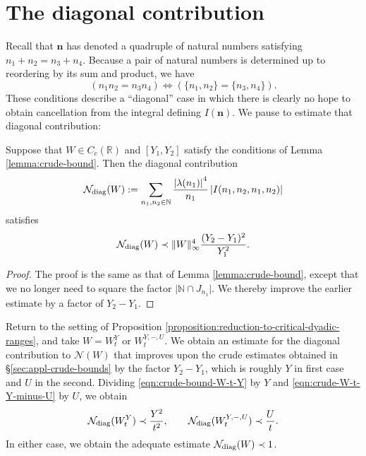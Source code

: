 \documentclass[reqno]{amsart} 
\begin{document}
\section{The diagonal contribution}\label{sec:cqx50az6mj}
Recall that $\mathbf{n}$ has denoted a quadruple of natural numbers satisfying $n _1 + n _2 = n _3 + n _4$.  Because a pair of natural numbers is determined up to reordering by its sum and product, we have
\begin{equation*}
  (n_1 n_2 = n_3 n_4) \iff ( \{n_1, n_2\} = \{n_3, n_4\}).
\end{equation*}
These conditions describe a ``diagonal'' case in which there is clearly no hope to obtain cancellation from the integral defining $I(\mathbf{n})$.  We pause to estimate that diagonal contribution:
\begin{lemma}
  Suppose that $W \in C_c(\mathbb{R})$ and $[Y_1,Y_2]$ satisfy the conditions of Lemma \ref{lemma:crude-bound}.  Then the diagonal contribution
  \begin{equation*}
    \mathcal{N}_{\operatorname{diag}}(W) := \sum _{n_1, n_2 \in \mathbb{N}}
    \frac{\left\lvert \lambda (n _1 ) \right\rvert ^4 }{ n _1 } \left\lvert I (n _1, n _2, n _1, n _2 ) \right\rvert
  \end{equation*}
  satisfies
  \begin{equation*}
    \mathcal{N}_{\operatorname{diag}}(W)
    \prec \lVert W \rVert_{\infty}^4 \frac{(Y _2 - Y _1 ) ^2 }{Y_1 ^2}.
  \end{equation*}
\end{lemma}
\begin{proof}
  The proof is the same as that of Lemma \ref{lemma:crude-bound}, except that we no longer need to square the factor $\lvert \mathbb{N} \cap J _{n_1} \rvert$.  We thereby improve the earlier estimate by a factor of $Y_2 - Y_1$.
\end{proof}
Return to the setting of Proposition \ref{proposition:reduction-to-critical-dyadic-ranges}, and take $W = W_t^Y$ or $W_t^{Y,-,U}$.  We obtain an estimate for the diagonal contribution to $\mathcal{N}(W)$ that improves upon the crude estimates obtained in \S\ref{sec:appl-crude-bounds} by the factor $Y_2 - Y_1$, which is roughly $Y$ in first case and $U$ in the second.  Dividing \eqref{eqn:crude-bound-W-t-Y} by $Y$ and \eqref{eqn:crude-W-t-Y-minus-U} by $U$, we obtain
\begin{equation*}
  \mathcal{N}_{\operatorname{diag}} (W_t^Y) \prec \frac{Y^2}{t^2}, \qquad
  \mathcal{N}_{\operatorname{diag}} (W_t^{Y,-,U}) \prec \frac{U}{t}.
\end{equation*}
In either case, we obtain the adequate estimate $\mathcal{N}_{\operatorname{diag}}(W) \prec 1$.
\end{document}
